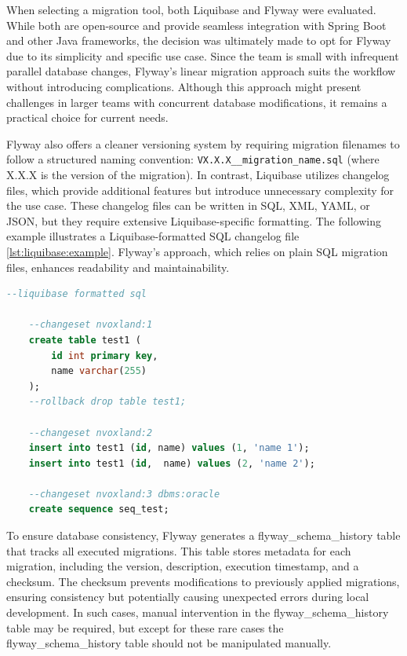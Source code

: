When selecting a migration tool, both Liquibase and Flyway were evaluated. While both are open-source and provide seamless integration with Spring Boot and other Java frameworks, the decision was ultimately made to opt for Flyway due to its simplicity and specific use case. Since the team is small with infrequent parallel database changes, Flyway’s linear migration approach suits the workflow without introducing complications. Although this approach might present challenges in larger teams with concurrent database modifications, it remains a practical choice for current needs.

Flyway also offers a cleaner versioning system by requiring migration filenames to follow a structured naming convention: \texttt{VX.X.X\_\_migration\_name.sql} (where X.X.X is the version of the migration). In contrast, Liquibase utilizes changelog files, which provide additional features but introduce unnecessary complexity for the use case. These changelog files can be written in SQL, XML, YAML, or JSON, but they require extensive Liquibase-specific formatting. The following example illustrates a Liquibase-formatted SQL changelog file \ref{lst:liquibase:example}. Flyway's approach, which relies on plain SQL migration files, enhances readability and maintainability.

\begin{lstlisting}[language=Sql,caption=Liquibase example changelog,label=lst:liquibase:example]
    --liquibase formatted sql
    
    --changeset nvoxland:1
    create table test1 (  
        id int primary key,
        name varchar(255)  
    );  
    --rollback drop table test1; 
    
    --changeset nvoxland:2 
    insert into test1 (id, name) values (1, 'name 1');
    insert into test1 (id,  name) values (2, 'name 2');  
    
    --changeset nvoxland:3 dbms:oracle
    create sequence seq_test;
\end{lstlisting}
    
To ensure database consistency, Flyway generates a flyway\_schema\_history table that tracks all executed migrations. This table stores metadata for each migration, including the version, description, execution timestamp, and a checksum. The checksum prevents modifications to previously applied migrations, ensuring consistency but potentially causing unexpected errors during local development. In such cases, manual intervention in the flyway\_schema\_history table may be required, but except for these rare cases the flyway\_schema\_history table should not be manipulated manually.

